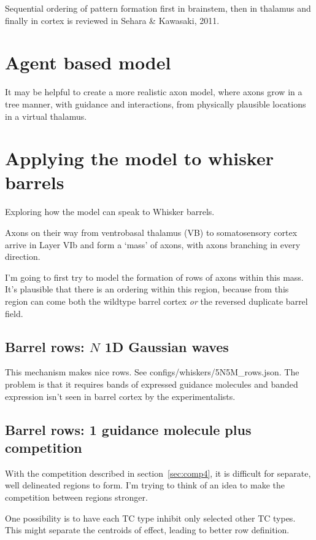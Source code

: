 \documentclass[11pt, a4paper]{article}
\newcommand{\code}[1]{\textsf{#1}}
\begin{document}
Sequential ordering of pattern formation first in brainstem, then in
thalamus and finally in cortex is reviewed in Sehara \& Kawasaki, 2011.

\section{Agent based model}

It may be helpful to create a more realistic axon model, where axons
grow in a tree manner, with guidance and interactions, from physically
plausible locations in a virtual thalamus.

\section{Applying the model to whisker barrels}

Exploring how the model can speak to Whisker barrels.

Axons on their way from ventrobasal thalamus (VB) to somatosensory
cortex arrive in Layer VIb and form a `mass' of axons, with axons
branching in every direction.

I'm going to first try to model the formation of rows of axons within
this mass. It's plausible that there is an ordering within this
region, because from this region can come both the wildtype barrel
cortex \emph{or} the reversed duplicate barrel field.

\subsection{Barrel rows: $N$ 1D Gaussian waves}

This mechanism makes nice
rows. See \code{configs/whiskers/5N5M\_rows.json}. The problem is that
it requires bands of expressed guidance molecules and banded
expression isn't seen in barrel cortex by the experimentalists.

\subsection{Barrel rows: 1 guidance molecule plus competition}

With the competition described in section~\ref{sec:comp4}, it is
difficult for separate, well delineated regions to form. I'm trying to
think of an idea to make the competition between regions stronger.

One possibility is to have each TC type inhibit only selected other TC
types. This might separate the centroids of effect, leading to better
row definition.
\end{document}
